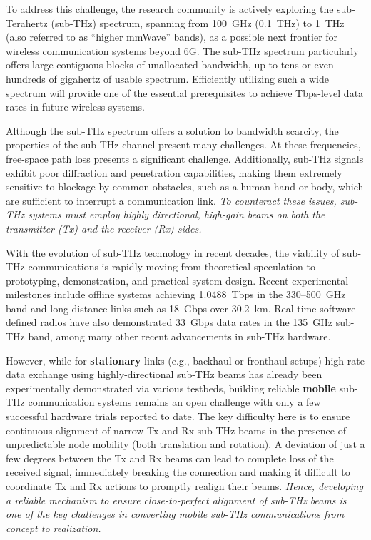 \documentclass[fleqn,10pt]{wlscirep}
\begin{document}
To address this challenge, the research community is actively exploring the sub-Terahertz (sub-THz) spectrum, spanning from 100~GHz (0.1~THz) to 1~THz (also referred to as ``higher mmWave'' bands\cite{9269931}), as a possible next frontier for wireless communication systems beyond 6G\cite{Kleine-Ostmann2011, Dang2020, DeAlwis2021, Samsung2020, Rappaport2019, 10494372}. The sub-THz spectrum particularly offers large contiguous blocks of unallocated bandwidth, up to tens or even hundreds of gigahertz of usable spectrum\cite{10171235, 9766110}. Efficiently utilizing such a wide spectrum will provide one of the essential prerequisites to achieve Tbps-level data rates in future wireless systems\cite{Nokia2022}.

Although the sub-THz spectrum offers a solution to bandwidth scarcity, the properties of the sub-THz channel present many challenges. At these frequencies, free-space path loss presents a significant challenge\cite{10422992, Yu2025Research, Kleine-Ostmann2011}. Additionally, sub-THz signals exhibit poor diffraction and penetration capabilities, making them extremely sensitive to blockage by common obstacles, such as a human hand or body, which are sufficient to interrupt a communication link\cite{10494372, Jornet2023}. \emph{To counteract these issues, sub-THz systems must employ highly directional, high-gain beams on both the transmitter (Tx) and the receiver (Rx) sides\cite{Kleine-Ostmann2011}.}

With the evolution of sub-THz technology in recent decades\cite{9766110, 10579941}, the viability of sub-THz communications is rapidly moving from theoretical speculation to prototyping, demonstration, and practical system design. Recent experimental milestones include offline systems achieving 1.0488~Tbps in the 330--500~GHz band and long-distance links such as 18~Gbps over 30.2~km\cite{Yu2025Research}. Real-time software-defined radios have also demonstrated 33~Gbps data rates in the 135~GHz sub-THz band\cite{9798100,10704668}, among many other recent advancements in sub-THz hardware.

However, while for \textbf{stationary} links (e.g., backhaul or fronthaul setups) high-rate data exchange using highly-directional sub-THz beams has already been experimentally demonstrated via various testbeds\cite{Sen2023, Li2024THz84Gbps, Samsung2021_140GHz}, building reliable \textbf{mobile} sub-THz communication systems remains an open challenge with only a few successful hardware trials reported to date\cite{Han2025THz_ISAC, Petrov2023Mobile}. The key difficulty here is to ensure continuous alignment of narrow Tx and Rx sub-THz beams in the presence of unpredictable node mobility (both translation and rotation)\cite{Stepanov2021, Wang2022, Petrov2023Mobile}. A deviation of just a few degrees between the Tx and Rx beams can lead to complete loss of the received signal, immediately breaking the connection and making it difficult to coordinate Tx and Rx actions to promptly realign their beams. \emph{Hence, developing a reliable mechanism to ensure close-to-perfect alignment of sub-THz beams is one of the key challenges in converting mobile sub-THz communications from concept to realization\cite{10036372, Petrov2023Mobile, Azari2022}.}
\end{document}
